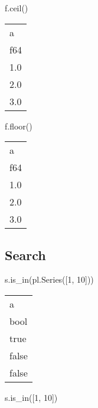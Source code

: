 \documentclass[
  letterpaper,
  DIV=11,
  numbers=noendperiod]{scrartcl}
\newenvironment{Shaded}{\begin{snugshade}}{\end{snugshade}}
\newcommand{\DecValTok}[1]{\textcolor[rgb]{0.68,0.00,0.00}{#1}}
\newcommand{\NormalTok}[1]{\textcolor[rgb]{0.00,0.23,0.31}{#1}}
\begin{document}
\begin{Shaded}
\begin{Highlighting}[]
\NormalTok{f.ceil()}
\end{Highlighting}
\end{Shaded}

\begin{longtable}[]{@{}l@{}}
\toprule()
a \\
f64 \\
\midrule()
\endhead
1.0 \\
2.0 \\
3.0 \\
\bottomrule()
\end{longtable}

\begin{Shaded}
\begin{Highlighting}[]
\NormalTok{f.floor()}
\end{Highlighting}
\end{Shaded}

\begin{longtable}[]{@{}l@{}}
\toprule()
a \\
f64 \\
\midrule()
\endhead
1.0 \\
2.0 \\
3.0 \\
\bottomrule()
\end{longtable}

\hypertarget{search}{%
\subsection{Search}\label{search}}

\begin{Shaded}
\begin{Highlighting}[]
\NormalTok{s.is\_in(pl.Series([}\DecValTok{1}\NormalTok{, }\DecValTok{10}\NormalTok{]))}
\end{Highlighting}
\end{Shaded}

\begin{longtable}[]{@{}l@{}}
\toprule()
a \\
bool \\
\midrule()
\endhead
true \\
false \\
false \\
\bottomrule()
\end{longtable}

\begin{Shaded}
\begin{Highlighting}[]
\NormalTok{s.is\_in([}\DecValTok{1}\NormalTok{, }\DecValTok{10}\NormalTok{])}
\end{Highlighting}
\end{Shaded}
\end{document}
